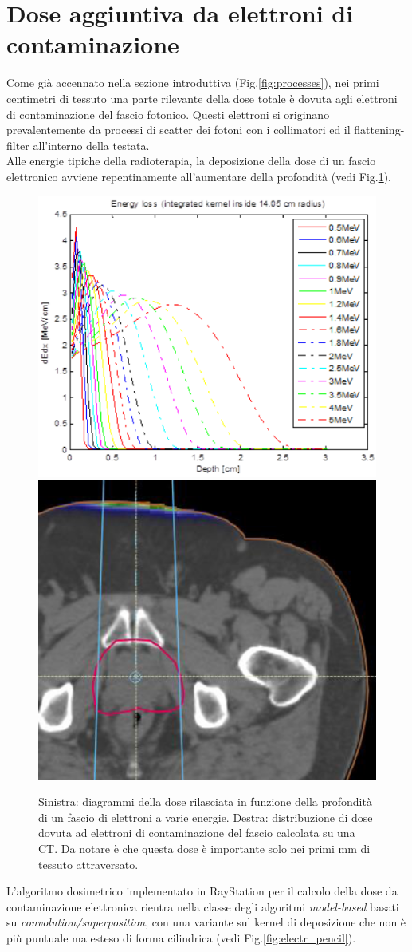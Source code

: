 {\section{Dose aggiuntiva da elettroni di contaminazione}
\label{sec:dose_electr}
Come già accennato nella sezione introduttiva (Fig.\ref{fig:processes}), nei primi centimetri di tessuto una parte rilevante della dose totale è dovuta agli elettroni di contaminazione del fascio fotonico. Questi elettroni si originano prevalentemente da processi di scatter dei fotoni con i collimatori ed il flattening-filter all'interno della testata.\\
Alle energie tipiche della radioterapia, la deposizione della dose di un fascio elettronico avviene repentinamente all'aumentare della profondità (vedi Fig.\ref{fig:electr_enloss}).
\begin{figure}
\centering
\includegraphics[width=.5\textwidth]{./cap1/electr_enloss.png}
\includegraphics[width=.45\textwidth]{./cap1/electr_doseCT.png}
\caption{Sinistra: diagrammi della dose rilasciata in funzione della profondità di un fascio di elettroni a varie energie. Destra: distribuzione di dose dovuta ad elettroni di contaminazione del fascio calcolata su una CT. Da notare è che questa dose è importante solo nei primi mm di tessuto attraversato.}
\label{fig:electr_enloss}
\end{figure}

L'algoritmo dosimetrico implementato in RayStation per il calcolo della dose da contaminazione elettronica rientra nella classe degli algoritmi \textit{model-based} basati su \textit{convolution/superposition}, con una variante sul kernel di deposizione che non è più puntuale ma esteso di forma cilindrica (vedi Fig.\ref{fig:electr_pencil}). 

}
